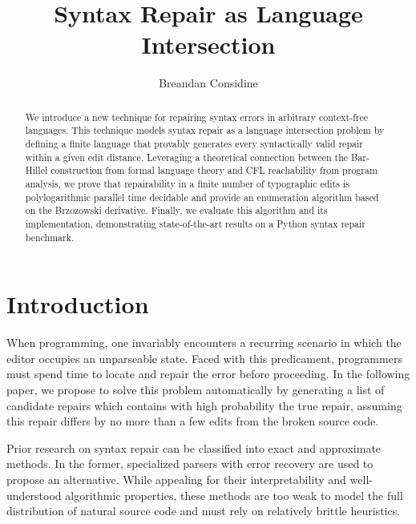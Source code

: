 \documentclass[sigplan,review,acmsmall,nonacm,screen,anonymous]{acmart}\settopmatter{printfolios=false,printccs=false,printacmref=false}
\begin{document}
%
\title{Syntax Repair as Language Intersection}
%
\begin{abstract}
We introduce a new technique for repairing syntax errors in arbitrary context-free languages. This technique models syntax repair as a language intersection problem by defining a finite language that provably generates every syntactically valid repair within a given edit distance. Leveraging a theoretical connection between the Bar-Hillel construction from formal language theory and CFL reachability from program analysis, we prove that repairability in a finite number of typographic edits is polylogarithmic parallel time decidable and provide an enumeration algorithm based on the Brzozowski derivative. Finally, we evaluate this algorithm and its implementation, demonstrating state-of-the-art results on a Python syntax repair benchmark.
\end{abstract}

\author{Breandan Considine}

\maketitle

\section{Introduction}

When programming, one invariably encounters a recurring scenario in which the editor occupies an unparseable state. Faced with this predicament, programmers must spend time to locate and repair the error before proceeding. In the following paper, we propose to solve this problem automatically by generating a list of candidate repairs which contains with high probability the true repair, assuming this repair differs by no more than a few edits from the broken source code.

Prior research on syntax repair can be classified into exact and approximate methods. In the former, specialized parsers with error recovery are used to propose an alternative. While appealing for their interpretability and well-understood algorithmic properties, these methods are too weak to model the full distribution of natural source code and must rely on relatively brittle heuristics.
\end{document}
